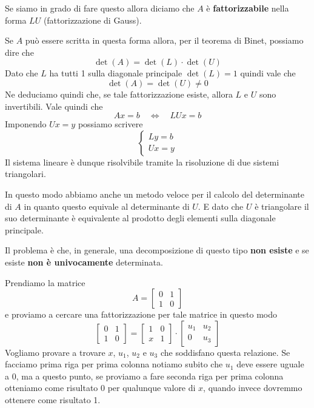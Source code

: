 Se siamo in grado di fare questo allora diciamo che $A$ è \textbf{fattorizzabile} nella forma $LU$
(fattorizzazione di Gauss).

\begin{observation}
	Se $A$ può essere scritta in questa forma allora, per il teorema di Binet, possiamo dire che
	\[ \det(A) = \det(L) \cdot \det(U) \]
	Dato che $L$ ha tutti 1 sulla diagonale principale $\det(L) = 1$ quindi vale che
	\[ \det(A) = \det(U) \neq 0 \]
	Ne deduciamo quindi che, se tale fattorizzazione esiste, allora $L$ e $U$ sono invertibili. Vale quindi che
	\[ A x = b \quad \Leftrightarrow \quad LU x = b \]
	Imponendo $U x = y$ possiamo scrivere
	\[
		\begin{cases}
			L y = b \\
			U x = y
		\end{cases}
	\]
	Il sistema lineare è dunque risolvibile tramite la risoluzione di due sistemi triangolari.
\end{observation}

\begin{observation}
	In questo modo abbiamo anche un metodo veloce per il calcolo del determinante di $A$ in quanto questo equivale
	al determinante di $U$. E dato che $U$ è triangolare il suo determinante è equivalente al prodotto degli
	elementi sulla diagonale principale.
\end{observation}

Il problema è che, in generale, una decomposizione di questo tipo \textbf{non esiste} e se esiste
\textbf{non è univocamente} determinata.

\begin{example}
	Prendiamo la matrice
	\[
		A  = \begin{bmatrix}
			0 & 1 \\
			1 & 0
		\end{bmatrix}
	\]
	e proviamo a cercare una fattorizzazione per tale matrice in questo modo
	\[
		\begin{bmatrix}
			0 & 1 \\
			1 & 0
		\end{bmatrix} =
		\begin{bmatrix}
			1 & 0 \\
			x & 1
		\end{bmatrix} \cdot
		\begin{bmatrix}
			u_1 & u_2 \\
			0   & u_3
		\end{bmatrix}
	\]
	Vogliamo provare a trovare $x$, $u_1$, $u_2$ e $u_3$ che soddisfano questa relazione. Se facciamo prima riga
	per prima colonna notiamo subito che $u_1$ deve essere uguale a 0, ma a questo punto, se proviamo a fare
	seconda riga per prima colonna otteniamo come risultato 0 per qualunque valore di $x$, quando invece dovremmo
	ottenere come risultato 1.
\end{example}

